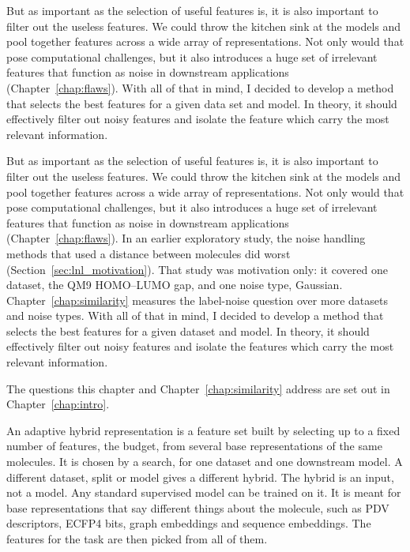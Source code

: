 But as important as the selection of useful features is, it is also important to filter out the useless features. We could throw the kitchen sink at the models and pool together features across a wide array of representations. Not only would that pose computational challenges, but it also introduces a huge set of irrelevant features that function as noise in downstream applications (Chapter~\ref{chap:flaws}). With all of that in mind, I decided to develop a method that selects the best features for a given data set and model. In theory, it should effectively filter out noisy features and isolate the feature which carry the most relevant information.

But as important as the selection of useful features is, it is also important to filter out the useless features. We could throw the kitchen sink at the models and pool together features across a wide array of representations. Not only would that pose computational challenges, but it also introduces a huge set of irrelevant features that function as noise in downstream applications (Chapter~\ref{chap:flaws}). In an earlier exploratory study, the noise handling methods that used a distance between molecules did worst (Section~\ref{sec:lnl_motivation}). That study was motivation only: it covered one dataset, the QM9 HOMO--LUMO gap, and one noise type, Gaussian. Chapter~\ref{chap:similarity} measures the label-noise question over more datasets and noise types. With all of that in mind, I decided to develop a method that selects the best features for a given dataset and model. In theory, it should effectively filter out noisy features and isolate the features which carry the most relevant information.

The questions this chapter and Chapter~\ref{chap:similarity} address are set out in Chapter~\ref{chap:intro}.

An adaptive hybrid representation is a feature set built by selecting up to a fixed number of features, the budget, from several base representations of the same molecules. It is chosen by a search, for one dataset and one downstream model. A different dataset, split or model gives a different hybrid. The hybrid is an input, not a model. Any standard supervised model can be trained on it. It is meant for base representations that say different things about the molecule, such as PDV descriptors, ECFP4 bits, graph embeddings and sequence embeddings. The features for the task are then picked from all of them.

